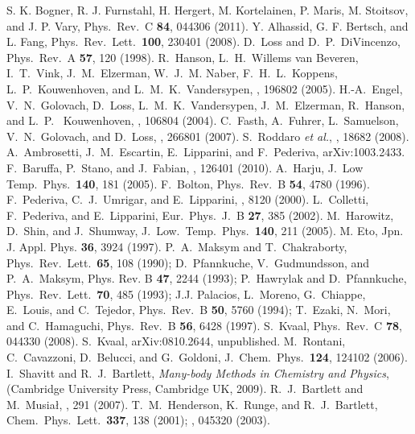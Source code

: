 \documentclass[twocolumn]{revtex4}
\begin{document}
\begin{thebibliography}{200}
 S. K. Bogner, R. J. Furnstahl, H. Hergert, M. Kortelainen, P. Maris, M. Stoitsov, and J. P. Vary, Phys.~Rev.~C {\bf 84}, 044306 (2011).
 Y. Alhassid, G. F. Bertsch, and L. Fang, Phys.~Rev.~Lett.~{\bf 100}, 230401 (2008).
 D.~Loss and D.~P.~DiVincenzo, Phys.~Rev.~A {\bf 57}, 120 (1998).
 R.~Hanson, L.~H.~Willems van Beveren, I.~T.~Vink, J.~M.~Elzerman, W.~J.~M. Naber, F.~H.~L.~Koppens, L.~P.~Kouwenhoven, and L.~M.~K.~Vandersypen, , 196802 (2005).
 H.-A.~Engel, V.~N.~Golovach, D.~Loss, L.~M.~K.~Vandersypen, J.~M.~Elzerman, R.~Hanson, and L.~P.~ Kouwenhoven, , 106804 (2004). 
 C.~Fasth, A.~Fuhrer, L.~Samuelson, V.~N.~Golovach, and D.~Loss, , 266801 (2007).
 S.~Roddaro {\em et al.}, , 18682 (2008).
A.~Ambrosetti, J.~M.~Escartin, E.~Lipparini, and F.~Pederiva, arXiv:1003.2433.
 F.~Baruffa, P.~Stano, and J.~Fabian, , 126401 (2010).
 A.~Harju, J.~Low Temp.~Phys.~{\bf 140}, 181 (2005).
 F.~Bolton, Phys.~Rev.~B {\bf 54}, 4780 (1996).
F.~Pederiva, C.~J.~Umrigar, and E.~Lipparini, , 8120 (2000).
L.~Colletti, F.~Pederiva, and  E.~Lipparini,  Eur.~Phys.~J.~B {\bf 27}, 
385 (2002).
 M.~Harowitz, D.~Shin, and J.~Shumway, J.~Low.~Temp.~Phys.~{\bf 140}, 211 (2005).
 M. Eto, Jpn. J. Appl. Phys. {\bf 36}, 3924 (1997).
 P.~A.~Maksym and T.~Chakraborty, Phys.~Rev.~Lett.~{\bf 65}, 108 (1990);
D.~Pfannkuche, V.~Gudmundsson, and P.~A.~Maksym, Phys. Rev. B {\bf 47}, 2244 (1993);
P.~Hawrylak and D.~Pfannkuche, Phys.~Rev.~Lett.~{\bf 70}, 485 (1993); J.J. Palacios,
L.~Moreno, G.~Chiappe, E.~Louis, and C.~Tejedor, Phys.~Rev.~B {\bf 50}, 5760 (1994);
T.~Ezaki, N.~Mori, and C.~Hamaguchi, Phys.~Rev.~B {\bf 56}, 6428 (1997).
 S.~Kvaal, Phys.~Rev.~C {\bf 78}, 044330 (2008).
 S.~Kvaal, arXiv:0810.2644, unpublished.
 M.~Rontani, C.~Cavazzoni, 
D.~Belucci, and G.~Goldoni, J.~Chem.~Phys.~{\bf 124}, 124102 (2006).
 I.~Shavitt and R.\ J.\ Bartlett, {\em Many-body Methods in Chemistry and Physics},  
(Cambridge University Press, Cambridge UK, 2009). 
 R.\ J.\ Bartlett and M.\ Musia{\l}, , 291 (2007).
 T.~M.~Henderson, K.~Runge, and R.~J.~Bartlett, Chem.~Phys.~Lett.~{\bf 337}, 138 (2001); , 045320 (2003).

\end{thebibliography}
\end{document}
